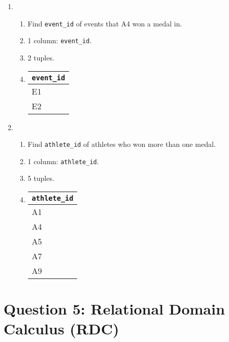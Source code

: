 \documentclass{article}
\begin{document}
\begin{enumerate}
    \item
    \begin{enumerate}
        \item Find \texttt{event\_id} of events that A4 won a medal in.
        \item 1 column: \texttt{event\_id}.
        \item 2 tuples.
        \item 
        \begin{tabular}{@{}l@{}}
            \toprule
            \texttt{event\_id} \\ \midrule
            E1          \\
            E2          \\ \bottomrule
        \end{tabular}
    \end{enumerate}

    \item \begin{enumerate}
        \item Find \texttt{athlete\_id} of athletes who won more than one medal.
        \item 1 column: \texttt{athlete\_id}.
        \item 5 tuples.
        \item
        \begin{tabular}{@{}l@{}}
            \toprule
            \texttt{athlete\_id} \\ \midrule
            A1          \\
            A4          \\
            A5          \\
            A7          \\
            A9          \\ \bottomrule
        \end{tabular}
    \end{enumerate}
\end{enumerate}
\newpage

\section*{Question 5: Relational Domain Calculus (RDC)}
\end{document}
